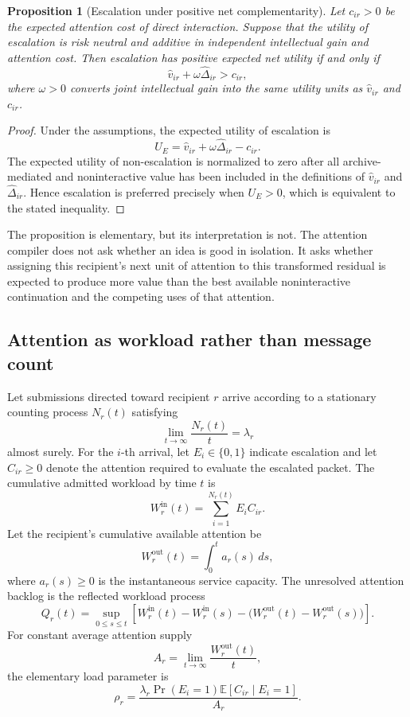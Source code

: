 \documentclass[11pt]{article}
\newtheorem{proposition}[definition]{Proposition}
\theoremstyle{definition}
\newcommand{\E}{\mathbb{E}}
\begin{document}
\begin{proposition}[Escalation under positive net complementarity]
Let \(c_{ir}>0\) be the expected attention cost of direct interaction. Suppose that the utility of escalation is risk neutral and additive in independent intellectual gain and attention cost. Then escalation has positive expected net utility if and only if
\[
\widehat{v}_{ir}
+
\omega\widehat{\Delta}_{ir}
>
c_{ir},
\]
where \(\omega>0\) converts joint intellectual gain into the same utility units as \(\widehat{v}_{ir}\) and \(c_{ir}\).
\end{proposition}

\begin{proof}
Under the assumptions, the expected utility of escalation is
\[
U_E
=
\widehat{v}_{ir}
+
\omega\widehat{\Delta}_{ir}
-
c_{ir}.
\]
The expected utility of non-escalation is normalized to zero after all archive-mediated and noninteractive value has been included in the definitions of \(\widehat{v}_{ir}\) and \(\widehat{\Delta}_{ir}\). Hence escalation is preferred precisely when \(U_E>0\), which is equivalent to the stated inequality.
\end{proof}

The proposition is elementary, but its interpretation is not. The attention compiler does not ask whether an idea is good in isolation. It asks whether assigning this recipient's next unit of attention to this transformed residual is expected to produce more value than the best available noninteractive continuation and the competing uses of that attention.

\subsection{Attention as workload rather than message count}

Let submissions directed toward recipient \(r\) arrive according to a stationary counting process \(N_r(t)\) satisfying
\[
\lim_{t\to\infty}\frac{N_r(t)}{t}
=
\lambda_r
\]
almost surely. For the \(i\)-th arrival, let \(E_i\in\{0,1\}\) indicate escalation and let \(C_{ir}\geq 0\) denote the attention required to evaluate the escalated packet. The cumulative admitted workload by time \(t\) is
\[
W_r^{\mathrm{in}}(t)
=
\sum_{i=1}^{N_r(t)}
E_i C_{ir}.
\]
Let the recipient's cumulative available attention be
\[
W_r^{\mathrm{out}}(t)
=
\int_0^t a_r(s)\,ds,
\]
where \(a_r(s)\geq 0\) is the instantaneous service capacity. The unresolved attention backlog is the reflected workload process
\[
Q_r(t)
=
\sup_{0\leq s\leq t}
\left[
W_r^{\mathrm{in}}(t)-W_r^{\mathrm{in}}(s)
-
\bigl(
W_r^{\mathrm{out}}(t)-W_r^{\mathrm{out}}(s)
\bigr)
\right].
\]
For constant average attention supply
\[
A_r
=
\lim_{t\to\infty}\frac{W_r^{\mathrm{out}}(t)}{t},
\]
the elementary load parameter is
\[
\rho_r
=
\frac{
\lambda_r
\Pr(E_i=1)
\E[C_{ir}\mid E_i=1]
}{
A_r
}.
\]
\end{document}
